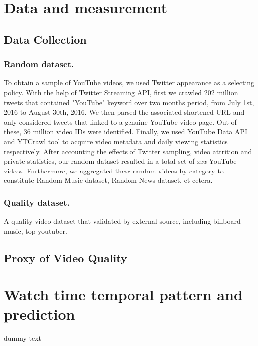 \documentclass[letterpaper]{article}
\begin{document}
\section{Data and measurement}

\subsection{Data Collection}

\subsubsection{Random dataset.} To obtain a sample of YouTube videos, we used Twitter appearance as a selecting policy. With the help of Twitter Streaming API, first we crawled 202 million tweets that contained "YouTube" keyword over two months period, from July 1st, 2016 to August 30th, 2016. We then parsed the associated shortened URL and only considered tweets that linked to a genuine YouTube video page. Out of these, 36 million video IDs were identified. Finally, we used YouTube Data API and YTCrawl tool \cite{Yu:2015lifecyle} to acquire video metadata and daily viewing statistics respectively. After accounting the effects of Twitter sampling, video attrition and private statistics, our random dataset resulted in a total set of \textit{xxx} YouTube videos. Furthermore, we aggregated these random videos by category to constitute Random Music dataset, Random News dataset, et cetera.

\subsubsection{Quality dataset.} A quality video dataset that validated by external source, including billboard music, top youtuber.

\subsection{Proxy of Video Quality}



\section{Watch time temporal pattern and prediction}
dummy text

\end{document}
